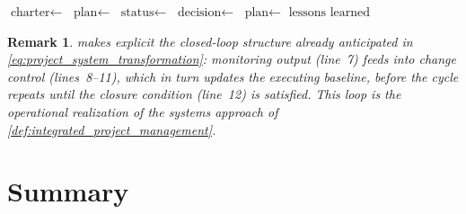 \documentclass[12pt, a4paper]{report}
\theoremstyle{engnotes}
\newtheorem{remark}{Remark}[section]
\begin{document}
\begin{algorithm}[H]
    \caption{Project Integration Management Process Flow}\label{alg:pim_process_flow}
    \begin{algorithmic}[1]
            \State $\text{charter} \gets$  
            \State $\text{plan} \gets$  
                \State {} 
                \State {} 
                \State $\text{status} \gets$  
                    \State $\text{decision} \gets$  
                        \State $\text{plan} \gets$ 
                    \EndIf
                \EndIf
                    \State {} 
                \EndIf
            \EndWhile
            \Return $\text{lessons learned}$
        \EndProcedure
    \end{algorithmic}
\end{algorithm}

\begin{remark}
     makes explicit the closed-loop structure already anticipated in \cref{eq:project_system_transformation}: monitoring output (line~7) feeds into change control (lines~8--11), which in turn updates the executing baseline, before the cycle repeats until the closure condition (line~12) is satisfied. This loop is the operational realization of the systems approach of \cref{def:integrated_project_management}.
\end{remark}

\section{Summary}
\label{sec:chapter1_summary}
\end{document}
